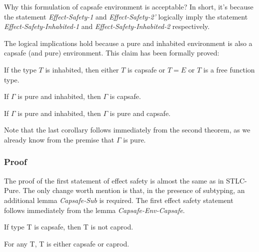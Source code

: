 Why this formulation of capsafe environment is acceptable? In short,
it's because the statement \emph{Effect-Safety-1} and
\emph{Effect-Safety-2'} logically imply the statement
\emph{Effect-Safety-Inhabited-1} and \emph{Effect-Safety-Inhabited-2}
respectively.

The logical implications hold because a pure and inhabited environment
is also a capsafe (and pure) environment. This claim has been formally
proved:

\begin{lemma}
  If the type $T$ is inhabited, then either $T$ is capsafe or $T = E$
  or $T$ is a free function type.
\end{lemma}

\begin{theorem}
  If $\Gamma$ is pure and inhabited, then $\Gamma$ is capsafe.
\end{theorem}

\begin{corollary}
  If $\Gamma$ is pure and inhabited, then $\Gamma$ is pure and
  capsafe.
\end{corollary}

Note that the last corollary follows immediately from the second
theorem, as we already know from the premise that $\Gamma$ is pure.


\subsubsection{Proof}

The proof of the first statement of effect safety is almost the same
as in STLC-Pure. The only change worth mention is that, in the
presence of subtyping, an additional lemma \emph{Capsafe-Sub} is
required.  The first effect safety statement follows immediately from
the lemma \emph{Capsafe-Env-Capsafe}.

\begin{lemma}
 If type T is capsafe, then T is not caprod.
\end{lemma}

\begin{lemma}
 For any T, T is either capsafe or caprod.
\end{lemma}

